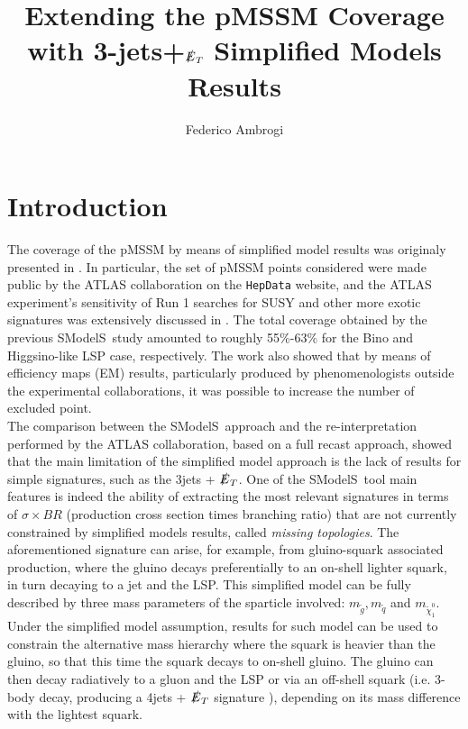 \documentclass[a4paper,11pt]{article}
\title{\boldmath Extending the pMSSM Coverage with 3-jets+$\slashed{E}_T$ Simplified Models Results}
\author[a]{Federico Ambrogi}
\affiliation[a]{University of Vienna, Faculty of Physics, Bolzmanngasse 5, A-1090 Wien, Austria}
\newcommand{\SMO}{{\sc SModelS}}
\begin{document}
 
\maketitle
                
                                           

\sffamily
\flushbottom

\section{Introduction}

The coverage of the pMSSM by means of simplified model results was originaly presented in \cite{Ambrogi:2017lov}. In particular, the set of pMSSM points considered were made public by the ATLAS collaboration on the \texttt{HepData} website\cite{ATLASpMSSMhepdata}, and the ATLAS experiment's sensitivity of Run 1 searches for SUSY and other more exotic signatures was extensively discussed in \cite{2015baa}. The total coverage obtained by the previous \SMO~study amounted to roughly 55$\%$-63$\%$ for the Bino and Higgsino-like LSP case, respectively. The work also showed that by means of efficiency maps (EM) results, particularly produced by phenomenologists outside the experimental collaborations, it was possible to increase the number of excluded point.
\\

The comparison between the \SMO~approach and the re-interpretation performed by the ATLAS collaboration, based on a full recast approach, showed that the main limitation of the simplified model approach is the lack of results for simple signatures, such as the 3jets + $\slashed{E}_T$. One of the \SMO~tool main features is indeed the ability of extracting the most relevant signatures in terms of $\sigma \times BR$ (production cross section  times branching ratio) that are not currently constrained by simplified models results, called \textit{missing topologies}. The aforementioned signature can arise, for example, from gluino-squark associated production, where the gluino decays preferentially to an on-shell lighter squark, in turn decaying to a jet and the LSP. This simplified model can be fully described by three mass parameters of the sparticle involved: $m_{\tilde g}, m_{\tilde q}$ and $m_{\tilde \chi _1 ^0}$. Under the simplified model assumption, results for such model can be used to constrain the alternative mass hierarchy where the squark is heavier than the gluino, so that this time the squark decays to on-shell gluino. The gluino can then decay radiatively to a gluon and the LSP or via an off-shell squark (i.e. 3-body decay, producing a 4jets + $\slashed{E}_T$ signature ), depending on its mass difference with the lightest squark. 
\\
\end{document}
